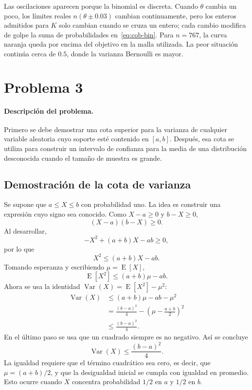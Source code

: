 \documentclass[10pt,a4paper,oneside]{article}
\newcommand{\E}{\operatorname{E}}
\newcommand{\Var}{\operatorname{Var}}
\begin{document}
Las oscilaciones aparecen porque la binomial es discreta. Cuando $\theta$ cambia un poco, los límites reales $n(\theta\pm0.03)$ cambian continuamente, pero los enteros admitidos para $K$ solo cambian cuando se cruza un entero; cada cambio modifica de golpe la suma de probabilidades en~\eqref{eq:cob-bin}. Para $n=767$, la curva naranja queda por encima del objetivo en la malla utilizada. La peor situación continúa cerca de $0.5$, donde la varianza Bernoulli es mayor.

\section{Problema 3}

\paragraph{Descripción del problema.}
Primero se debe demostrar una cota superior para la varianza de cualquier variable aleatoria cuyo soporte esté contenido en $[a,b]$. Después, esa cota se utiliza para construir un intervalo de confianza para la media de una distribución desconocida cuando el tamaño de muestra es grande.

\subsection*{Demostración de la cota de varianza}

Se supone que $a\leq X\leq b$ con probabilidad uno. La idea es construir una expresión cuyo signo sea conocido. Como $X-a\geq0$ y $b-X\geq0$,
\begin{equation*}
(X-a)(b-X)\geq0.
\end{equation*}
Al desarrollar,
\begin{equation*}
-X^2+(a+b)X-ab\geq0,
\end{equation*}
por lo que
\begin{equation*}
X^2\leq(a+b)X-ab.
\end{equation*}
Tomando esperanza y escribiendo $\mu=\E[X]$,
\begin{equation*}
\E[X^2]\leq(a+b)\mu-ab.
\end{equation*}
Ahora se usa la identidad $\Var(X)=\E[X^2]-\mu^2$:
\begin{align*}
\Var(X)
&\leq(a+b)\mu-ab-\mu^2\\
&=\frac{(b-a)^2}{4}-\left(\mu-\frac{a+b}{2}\right)^2\\
&\leq\frac{(b-a)^2}{4}.
\end{align*}
En el último paso se usa que un cuadrado siempre es no negativo. Así se concluye
\begin{equation}
\boxed{\Var(X)\leq\frac{(b-a)^2}{4}.}
\label{eq:popoviciu}
\end{equation}
La igualdad requiere que el término cuadrático sea cero, es decir, que $\mu=(a+b)/2$, y que la desigualdad inicial se cumpla con igualdad en promedio. Esto ocurre cuando $X$ concentra probabilidad $1/2$ en $a$ y $1/2$ en $b$.
\end{document}
